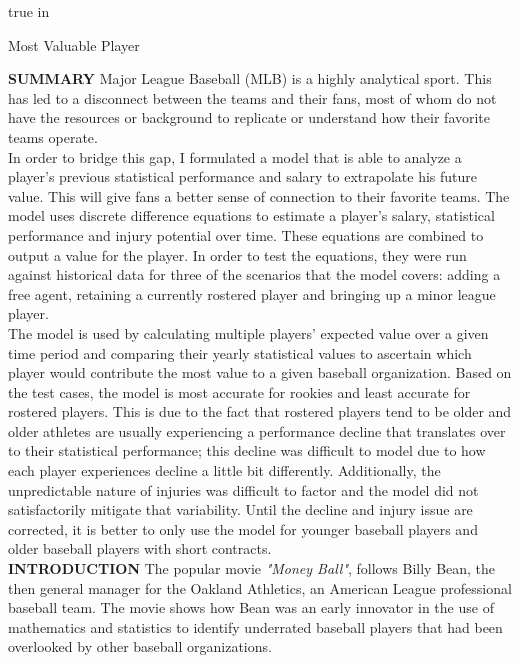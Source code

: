 \documentclass[12pt]{article}
\begin{document}
\begin{doublespace}
 true in
\end{doublespace}

\vskip 12pt

\centerline{Most Valuable Player}
\vskip 2pt
\textbf{SUMMARY}
\vskip 2pt
Major League Baseball (MLB) is a highly analytical sport.  This has led to a disconnect between the teams and their fans, most of whom do not have the resources or background to replicate or understand how their favorite teams operate.  \\

In order to bridge this gap,  I formulated a model that is able to analyze a player's previous statistical performance and salary to extrapolate his future value.  This will give fans a better sense of connection to their favorite teams.  The model uses discrete difference equations to estimate a player's salary, statistical performance and injury potential over time.  These equations are combined to output a value for the player.  In order to test the equations, they were run against historical data for three of the scenarios that the model covers: adding a free agent, retaining a currently rostered player and bringing up a minor league player. \\

The model is used by calculating multiple players' expected value over a given time period and comparing their yearly statistical values to ascertain which player would contribute the most value to a given baseball organization. Based on the test cases, the model is most accurate for rookies and least accurate for rostered players.  This is due to the fact that rostered players tend to be older and older athletes are usually experiencing a performance decline that translates over to their statistical performance;  this decline was difficult to model due to how each player experiences decline a little bit differently.  Additionally, the unpredictable nature of injuries was difficult to factor and the model did not satisfactorily mitigate that variability.  Until the decline and injury issue are corrected, it is better to only use the model for younger baseball players and older baseball players with short contracts.\\
\vskip 2pt
\textbf{INTRODUCTION}
\vskip 2pt
The popular movie \textit{"Money Ball"}, follows Billy Bean, the then general manager for the Oakland Athletics, an American League professional baseball team.  The movie shows how Bean was an early innovator in the use of mathematics and statistics to identify underrated baseball players that had been overlooked by other baseball organizations.  \\
\end{document}
